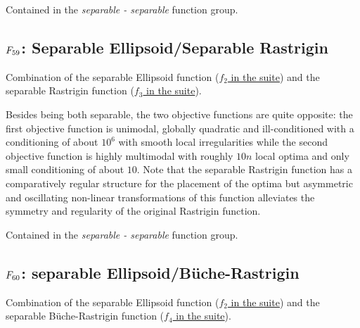Contained in the \emph{separable - separable} function group.



\subsection[\texorpdfstring{\protect\(F_{59}\protect\): Separable Ellipsoid/Separable Rastrigin}{F59: Separable Ellipsoid/Separable Rastrigin}]{\texorpdfstring{\protect\(F_{59}\protect\): Separable Ellipsoid/Separable Rastrigin}{}}
\label{index:separable-ellipsoid-separable-rastrigin}\label{index:f59}
Combination of the separable Ellipsoid function (\href{https://coco.gforge.inria.fr/downloads/download16.00/bbobdocfunctions.pdf\#page=10}{\(f_2\) in the \bbob suite}) and the
separable Rastrigin function (\href{https://coco.gforge.inria.fr/downloads/download16.00/bbobdocfunctions.pdf\#page=15}{\(f_3\) in the \bbob suite}).

Besides being both separable, the two objective functions are quite opposite:
the first objective function is unimodal, globally quadratic and ill-conditioned
with a conditioning of about \(10^6\) with smooth local irregularities while
the second objective function is highly multimodal with roughly \(10n\) local
optima and only small conditioning of about \(10\). Note that the separable
Rastrigin function has a comparatively regular structure for the
placement of the optima but asymmetric and oscillating non-linear transformations
of this function alleviates the symmetry and regularity of the original Rastrigin function.

Contained in the \emph{separable - separable} function group.



\subsection[\texorpdfstring{\protect\(F_{60}\protect\): separable Ellipsoid/B\"{u}che-Rastrigin}{F60: separable Ellipsoid/B\"{u}che-Rastrigin}]{\texorpdfstring{\protect\(F_{60}\protect\): separable Ellipsoid/B\"{u}che-Rastrigin}{}}
\label{index:separable-ellipsoid-buche-rastrigin}\label{index:f60}
Combination of the separable Ellipsoid function (\href{https://coco.gforge.inria.fr/downloads/download16.00/bbobdocfunctions.pdf\#page=10}{\(f_2\) in the \bbob suite}) and the
separable B\"{u}che-Rastrigin function (\href{https://coco.gforge.inria.fr/downloads/download16.00/bbobdocfunctions.pdf\#page=20}{\(f_4\) in the \bbob suite}).

